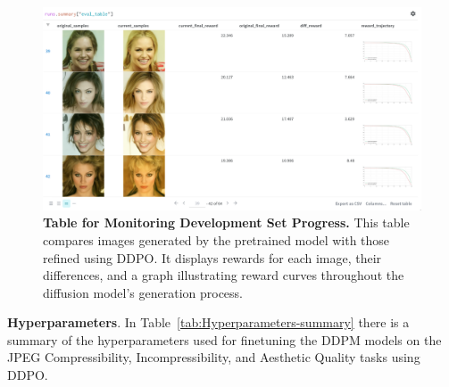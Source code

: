 \begin{appendixs}
    \begin{figure}
        \centering
        \includegraphics[scale=0.42]{img/results/devset-logging-table.png}
        \vspace{-0pt}  %
        \captionsetup{width=\textwidth} %
        \caption{\textbf{Table for Monitoring Development Set Progress.} This table compares images generated by the pretrained model with those refined using DDPO. It displays rewards for each image, their differences, and a graph illustrating reward curves throughout the diffusion model's generation process.}
        \label{fig:devset-table}
    \end{figure}

    \noindent \textbf{Hyperparameters}. In Table~\ref{tab:Hyperparameters-summary} there is a summary of the hyperparameters used for finetuning the DDPM models on the JPEG Compressibility, Incompressibility, and Aesthetic Quality tasks using DDPO. \\



\end{appendixs}
